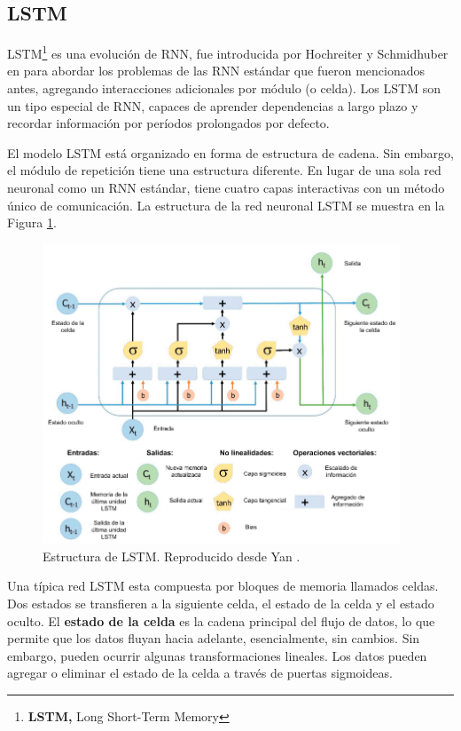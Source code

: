 \subsection{LSTM}

LSTM\footnote{\textbf{LSTM,} Long Short-Term Memory} es una evoluci\'{o}n de RNN, fue introducida por Hochreiter y Schmidhuber en \cite{52} para abordar los problemas de las RNN est\'{a}ndar que fueron mencionados antes, agregando interacciones adicionales por m\'{o}dulo (o celda). Los LSTM son un tipo especial de RNN, capaces de aprender dependencias a largo plazo y recordar información por períodos prolongados por defecto.

\vspace{5mm} %

El modelo LSTM está organizado en forma de estructura de cadena. Sin embargo, el módulo de repetición tiene una estructura diferente. En lugar de una sola red neuronal como un RNN estándar, tiene cuatro capas interactivas con un método único de comunicación. La estructura de la red neuronal LSTM se muestra en la Figura \ref{fig:lstm}.

\begin{figure}[h!]
  \begin{center}	\includegraphics[width=0.95\textwidth]{imagenes/Cap4/lstm}
  \caption{Estructura de LSTM. Reproducido desde Yan \cite{54}.} 
  \label{fig:lstm}
  \end{center}
\end{figure}

Una t\'{i}pica red LSTM esta compuesta por bloques de memoria llamados celdas. Dos estados se transfieren a la siguiente celda, el estado de la celda y el estado oculto. El \textbf{estado de la celda} es la cadena principal del flujo de datos, lo que permite que los datos fluyan hacia adelante, esencialmente, sin cambios. Sin embargo, pueden ocurrir algunas transformaciones lineales. Los datos pueden agregar o eliminar el estado de la celda a trav\'{e}s de puertas sigmoideas.

